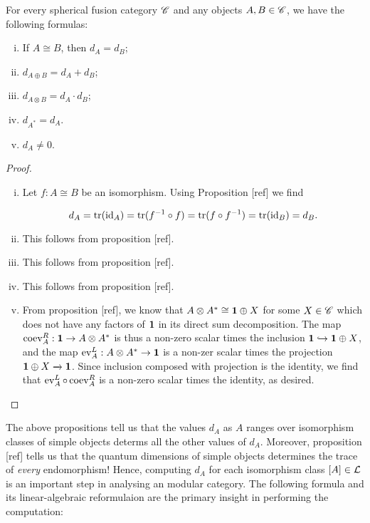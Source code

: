 \begin{proposition} For every spherical fusion category $\mathscr{C}$ and any objects $A,B\in \mathscr{C}$, we have the following formulas:

\begin{enumerate}[(i)]
\item If $A\cong B$, then $d_A=d_B$;
\item $d_{A\oplus B}=d_{A}+d_B$;
\item $d_{A\otimes B}=d_{A}\cdot d_{B}$;
\item $d_{A^*}=d_A$.
\item $d_A\neq 0$.
\end{enumerate}
\end{proposition}
\begin{proof}$\,$
\begin{enumerate}[(i)]
\item Let $f:A\cong B$ be an isomorphism. Using Proposition [ref] we find

$$d_A=\operatorname{tr}(\operatorname{id}_{A})=\operatorname{tr}(f^{-1}\circ f)=\operatorname{tr}(f\circ f^{-1})=\operatorname{tr}(\operatorname{id}_{B})=d_B.$$

\item This follows from proposition [ref].
\item This follows from proposition [ref].
\item This follows from proposition [ref].
\item From proposition [ref], we know that $A\otimes A^* \cong \mathbf{1} \oplus X$ for some $X\in \mathscr{C}$ which does not have any factors of $\mathbf{1}$ in its direct sum decomposition. The map $\operatorname{coev}^R_A: \mathbf{1} \to A\otimes A^*$ is thus a non-zero scalar times the inclusion $\mathbf{1} \hookrightarrow{} \mathbf{1}\oplus X$, and the map $\operatorname{ev}^L_A: A\otimes A^*\to \mathbf{1}$ is a non-zer scalar times the projection $\mathbf{1} \oplus X \xrightarrow{}\mathbf{1}$. Since inclusion composed with projection is the identity, we find that $\operatorname{ev}^{L}_{A}\circ \operatorname{coev}^R_{A}$ is a non-zero scalar times the identity, as desired.
\end{enumerate}
\end{proof}

The above propositions tell us that the values $d_A$ as $A$ ranges over isomorphism classes of simple objects determs all the other values of $d_A$. Moreover, proposition [ref] tells us that the quantum dimensions of simple objects determines the trace of \textit{every} endomorphism! Hence, computing $d_{A}$ for each isomorphism class $[A]\in \mathcal{L}$ is an important step in analysing an modular category. The following formula and its linear-algebraic reformulaion are the primary insight in performing the computation:

